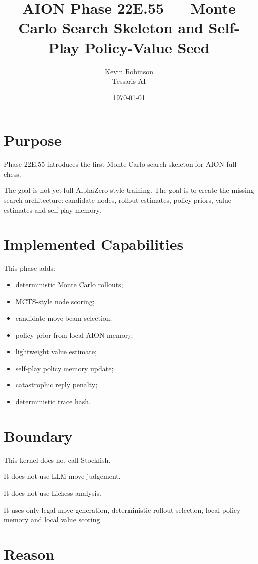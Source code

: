 \documentclass[11pt,a4paper]{article}
\title{\textbf{AION Phase 22E.55 --- Monte Carlo Search Skeleton and Self-Play Policy-Value Seed}}
\author{Kevin Robinson\\Tessaris AI}
\date{\today}
\begin{document}
\maketitle

\section{Purpose}

Phase 22E.55 introduces the first Monte Carlo search skeleton for AION full chess.

The goal is not yet full AlphaZero-style training. The goal is to create the missing search architecture: candidate nodes, rollout estimates, policy priors, value estimates and self-play memory.

\section{Implemented Capabilities}

This phase adds:

\begin{itemize}
  \item deterministic Monte Carlo rollouts;
  \item MCTS-style node scoring;
  \item candidate move beam selection;
  \item policy prior from local AION memory;
  \item lightweight value estimate;
  \item self-play policy memory update;
  \item catastrophic reply penalty;
  \item deterministic trace hash.
\end{itemize}

\section{Boundary}

This kernel does not call Stockfish.

It does not use LLM move judgement.

It does not use Lichess analysis.

It uses only legal move generation, deterministic rollout selection, local policy memory and local value scoring.

\section{Reason}
\end{document}
